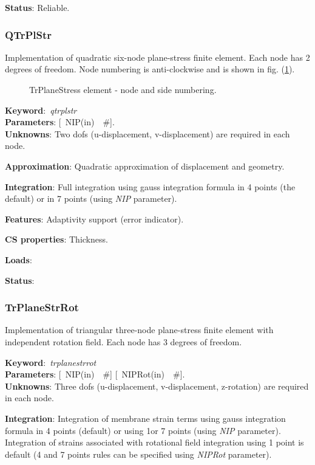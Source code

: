 \documentclass[12pt,dvips]{article}
\newcommand{\descitem}[1]{{\noindent \bf #1}:}
\newcommand{\elemkeyword}[1]{\descitem{Keyword}~{\em #1}}
\newcommand{\elemparam}[2]{{{#1\tiny (#2)}~~\#}}
\newcommand{\optelemparam}[2]{{[~\elemparam{#1}{#2}]}}
\newcommand{\param}[1]{{\it #1}}
\begin{document}
\descitem{Status} Reliable.

\subsubsection{QTrPlStr}
Implementation of quadratic six-node plane-stress finite
element. Each node has 2 degrees of freedom. Node numbering is
anti-clockwise and is shown in fig. (\ref{qtrplanstressfig}).

\begin{figure}[htb]
\begin{center}\end{center}
\caption{TrPlaneStress element - node and side numbering.}
\label{qtrplanstressfig}
\end{figure}

\elemkeyword{qtrplstr}\\
\descitem{Parameters} \optelemparam{NIP}{in}.\\
\descitem{Unknowns}
Two dofs (u-displacement, v-displacement) are required in each node.

\descitem{Approximation} Quadratic approximation of displacement and
geometry.

\descitem{Integration}
Full integration using gauss integration formula in 4 points (the
default) or in 7 points (using \param{NIP} parameter).

\descitem{Features} Adaptivity support (error indicator).

\descitem{CS properties} Thickness. 

\descitem{Loads} 

\descitem{Status} 

\subsubsection{TrPlaneStrRot}
Implementation of triangular three-node  plane-stress 
finite element with independent rotation field.
Each node has 3 degrees of freedom.

\elemkeyword{trplanestrrot}\\
\descitem{Parameters} \optelemparam{NIP}{in} \optelemparam{NIPRot}{in}.\\
\descitem{Unknowns}
Three dofs (u-displacement, v-displacement, z-rotation) are required in each node.


\descitem{Integration}
Integration of membrane strain terms using gauss integration formula
in 4 points (default) or using 1or 7 points (using \param{NIP} parameter).
Integration of strains associated with rotational field 
integration using 1 point is default (4 and 7 points rules can be
specified using \param{NIPRot} parameter).
\end{document}
